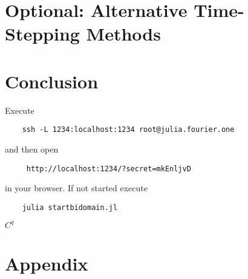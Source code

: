 \documentclass{finalproject}
\begin{document}
\section{Optional: Alternative Time-Stepping Methods}


\section{Conclusion}
Execute
\begin{verbatim}
    ssh -L 1234:localhost:1234 root@julia.fourier.one
\end{verbatim}
and then open
\begin{verbatim}
     http://localhost:1234/?secret=mkEnljvD
\end{verbatim}
in your browser. If not started execute
\begin{verbatim}
    julia startbidomain.jl
\end{verbatim}
$C^q$
\printbibliography
\clearpage
\section*{Appendix}
\end{document}
